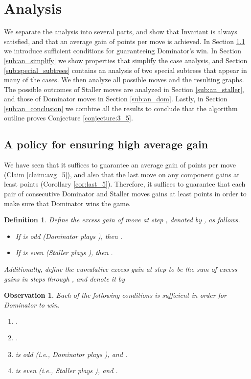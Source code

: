 \documentclass[11pt]{article}
\def\Proof{\par\noindent{\bf Proof:~}}
\def\dnsitem{\vspace{-7pt}\item}
\newtheorem{definition}[theorem]{Definition}
\newtheorem{observation}[theorem]{Observation}
\theoremstyle{definition}
\begin{document}
\section{Analysis}
\label{section:analysis}

We separate the analysis into several parts, and show that Invariant  is always satisfied, and that an average gain of  points per move is achieved.
In Section \ref{sub:an_gain} we introduce sufficient conditions for guaranteeing Dominator's win.
In Section \ref{sub:an_simplify}  we show properties that simplify the case analysis,
and Section \ref{sub:special_subtrees} contains an analysis of two special subtrees that appear in many of the cases. 
We then analyze all possible moves and the resulting graphs.
The possible outcomes of Staller moves are analyzed in Section \ref{sub:an_staller}, 
and those of Dominator moves in Section \ref{sub:an_dom}.
Lastly, in Section \ref{sub:an_conclusion} we combine all the results to conclude that the algorithm outline proves Conjecture \ref{conjecture:3_5}.

\subsection{A policy for ensuring high average gain}
\label{sub:an_gain}

We have seen that it suffices to guarantee an average gain of  points per move (Claim \ref{claim:avg_5}), 
and also that the last move on any component gains at least  points (Corollary \ref{cor:last_5}).
Therefore, it suffices to guarantee that each pair of consecutive Dominator and Staller moves gains at least  points in order to make sure that Dominator wins the game.

\begin{definition}
\label{def:excess_gain}
Define the \emph{excess gain} of move  at step , denoted by , as follows.
\begin{itemize}
	\dnsitem If  is odd (Dominator plays ), then .
	\dnsitem If  is even (Staller plays ), then .
\end{itemize}
Additionally, define the \emph{cumulative excess gain} at step  to be the sum of excess gains in steps  through , and denote it by 

\end{definition}

\begin{observation}
\label{obs:sufficient_overhead}
Each of the following conditions is sufficient in order for Dominator to win.
\begin{enumerate}
	\dnsitem .
	\dnsitem .
	\dnsitem  is odd (i.e., Dominator plays ), and .
	\dnsitem  is even (i.e., Staller plays ), and . 
\end{enumerate}
\end{observation}
\Proof
 
\end{document}
